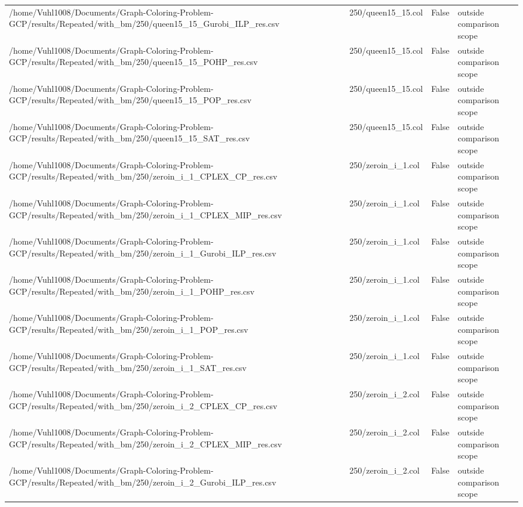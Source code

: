 \begin{table}[htbp]
\begin{tabular}{llll}
/home/Vuhl1008/Documents/Graph-Coloring-Problem-GCP/results/Repeated/with\_bm/250/queen15\_15\_Gurobi\_ILP\_res.csv & 250/queen15\_15.col & False & outside comparison scope \\
/home/Vuhl1008/Documents/Graph-Coloring-Problem-GCP/results/Repeated/with\_bm/250/queen15\_15\_POHP\_res.csv & 250/queen15\_15.col & False & outside comparison scope \\
/home/Vuhl1008/Documents/Graph-Coloring-Problem-GCP/results/Repeated/with\_bm/250/queen15\_15\_POP\_res.csv & 250/queen15\_15.col & False & outside comparison scope \\
/home/Vuhl1008/Documents/Graph-Coloring-Problem-GCP/results/Repeated/with\_bm/250/queen15\_15\_SAT\_res.csv & 250/queen15\_15.col & False & outside comparison scope \\
/home/Vuhl1008/Documents/Graph-Coloring-Problem-GCP/results/Repeated/with\_bm/250/zeroin\_i\_1\_CPLEX\_CP\_res.csv & 250/zeroin\_i\_1.col & False & outside comparison scope \\
/home/Vuhl1008/Documents/Graph-Coloring-Problem-GCP/results/Repeated/with\_bm/250/zeroin\_i\_1\_CPLEX\_MIP\_res.csv & 250/zeroin\_i\_1.col & False & outside comparison scope \\
/home/Vuhl1008/Documents/Graph-Coloring-Problem-GCP/results/Repeated/with\_bm/250/zeroin\_i\_1\_Gurobi\_ILP\_res.csv & 250/zeroin\_i\_1.col & False & outside comparison scope \\
/home/Vuhl1008/Documents/Graph-Coloring-Problem-GCP/results/Repeated/with\_bm/250/zeroin\_i\_1\_POHP\_res.csv & 250/zeroin\_i\_1.col & False & outside comparison scope \\
/home/Vuhl1008/Documents/Graph-Coloring-Problem-GCP/results/Repeated/with\_bm/250/zeroin\_i\_1\_POP\_res.csv & 250/zeroin\_i\_1.col & False & outside comparison scope \\
/home/Vuhl1008/Documents/Graph-Coloring-Problem-GCP/results/Repeated/with\_bm/250/zeroin\_i\_1\_SAT\_res.csv & 250/zeroin\_i\_1.col & False & outside comparison scope \\
/home/Vuhl1008/Documents/Graph-Coloring-Problem-GCP/results/Repeated/with\_bm/250/zeroin\_i\_2\_CPLEX\_CP\_res.csv & 250/zeroin\_i\_2.col & False & outside comparison scope \\
/home/Vuhl1008/Documents/Graph-Coloring-Problem-GCP/results/Repeated/with\_bm/250/zeroin\_i\_2\_CPLEX\_MIP\_res.csv & 250/zeroin\_i\_2.col & False & outside comparison scope \\
/home/Vuhl1008/Documents/Graph-Coloring-Problem-GCP/results/Repeated/with\_bm/250/zeroin\_i\_2\_Gurobi\_ILP\_res.csv & 250/zeroin\_i\_2.col & False & outside comparison scope \\

\end{tabular}
\end{table}
